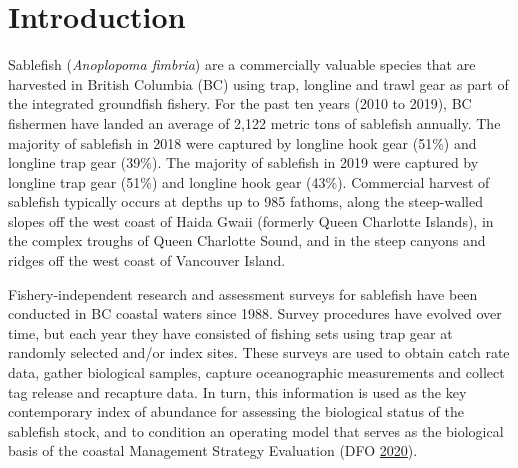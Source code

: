 \documentclass[12pt]{article}\usepackage[]{graphicx}\usepackage[]{color}
\begin{document}

\frontmatter


\renewcommand{\headrulewidth}{0.5pt}  %
\renewcommand{\footrulewidth}{0.5pt}  %

\hypertarget{introduction}{%
\section{Introduction}\label{introduction}}

Sablefish (\emph{Anoplopoma fimbria}) are a commercially valuable species that are harvested in British Columbia (BC) using trap, longline and trawl gear as part of the integrated groundfish fishery. For the past ten years (2010 to 2019), BC fishermen have landed an average of 2,122 metric tons of sablefish annually. The majority of sablefish in 2018 were captured by longline hook gear (51\%) and longline trap gear (39\%). The majority of sablefish in 2019 were captured by longline trap gear (51\%) and longline hook gear (43\%). Commercial harvest of sablefish typically occurs at depths up to 985 fathoms, along the steep-walled slopes off the west coast of Haida Gwaii (formerly Queen Charlotte Islands), in the complex troughs of Queen Charlotte Sound, and in the steep canyons and ridges off the west coast of Vancouver Island.

Fishery-independent research and assessment surveys for sablefish have been conducted in BC coastal waters since 1988. Survey procedures have evolved over time, but each year they have consisted of fishing sets using trap gear at randomly selected and/or index sites. These surveys are used to obtain catch rate data, gather biological samples, capture oceanographic measurements and collect tag release and recapture data. In turn, this information is used as the key contemporary index of abundance for assessing the biological status of the sablefish stock, and to condition an operating model that serves as the biological basis of the coastal Management Strategy Evaluation (DFO \protect\hyperlink{ref-dfo2020}{2020}).
\end{document}
